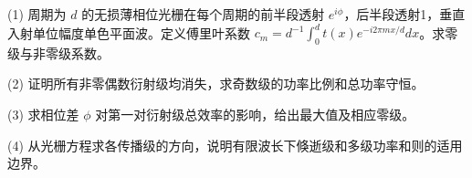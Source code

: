 (1) 周期为 \(d\) 的无损薄相位光栅在每个周期的前半段透射 \(e^{i\phi}\)，后半段透射1，垂直入射单位幅度单色平面波。定义傅里叶系数 \(c_m=d^{-1}\int_0^dt(x)e^{-i2\pi mx/d}dx\)。求零级与非零级系数。

(2) 证明所有非零偶数衍射级均消失，求奇数级的功率比例和总功率守恒。

(3) 求相位差 \(\phi\) 对第一对衍射级总效率的影响，给出最大值及相应零级。

(4) 从光栅方程求各传播级的方向，说明有限波长下倏逝级和多级功率和则的适用边界。
